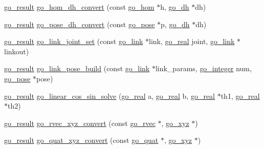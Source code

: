 \begin{DoxyCompactItemize}
\item 
\hyperlink{gotypes_8h_a55d48b38cd959f63c7e8db8337a9792a}{go\-\_\-result} \hyperlink{namespacegomotion_a0a74226c6cb3bb8179462ddcf13071c0}{go\-\_\-hom\-\_\-dh\-\_\-convert} (const \hyperlink{structgomotion_1_1go__hom}{go\-\_\-hom} $\ast$h, \hyperlink{structgomotion_1_1go__dh}{go\-\_\-dh} $\ast$dh)
\item 
\hyperlink{gotypes_8h_a55d48b38cd959f63c7e8db8337a9792a}{go\-\_\-result} \hyperlink{namespacegomotion_a50ed052e0f5e1f8cf7ebbd88bb625529}{go\-\_\-pose\-\_\-dh\-\_\-convert} (const \hyperlink{structgomotion_1_1go__pose}{go\-\_\-pose} $\ast$p, \hyperlink{structgomotion_1_1go__dh}{go\-\_\-dh} $\ast$dh)
\item 
\hyperlink{gotypes_8h_a55d48b38cd959f63c7e8db8337a9792a}{go\-\_\-result} \hyperlink{namespacegomotion_a3ad7a9d8622d81c4643767f386e65c7b}{go\-\_\-link\-\_\-joint\-\_\-set} (const \hyperlink{structgomotion_1_1go__link}{go\-\_\-link} $\ast$link, \hyperlink{gotypes_8h_afd666a2393eebd71ee455846ac9def9b}{go\-\_\-real} joint, \hyperlink{structgomotion_1_1go__link}{go\-\_\-link} $\ast$linkout)
\item 
\hyperlink{gotypes_8h_a55d48b38cd959f63c7e8db8337a9792a}{go\-\_\-result} \hyperlink{namespacegomotion_aab8aefb3568a017fce0b6746433f1e71}{go\-\_\-link\-\_\-pose\-\_\-build} (const \hyperlink{structgomotion_1_1go__link}{go\-\_\-link} $\ast$link\-\_\-params, \hyperlink{gotypes_8h_a7d30f606bb0f58ffe2b3bd71e5c8af5c}{go\-\_\-integer} num, \hyperlink{structgomotion_1_1go__pose}{go\-\_\-pose} $\ast$pose)
\item 
\hyperlink{gotypes_8h_a55d48b38cd959f63c7e8db8337a9792a}{go\-\_\-result} \hyperlink{namespacegomotion_a2f4017a309177fcfd725465ff6d0652b}{go\-\_\-linear\-\_\-cos\-\_\-sin\-\_\-solve} (\hyperlink{gotypes_8h_afd666a2393eebd71ee455846ac9def9b}{go\-\_\-real} a, \hyperlink{gotypes_8h_afd666a2393eebd71ee455846ac9def9b}{go\-\_\-real} b, \hyperlink{gotypes_8h_afd666a2393eebd71ee455846ac9def9b}{go\-\_\-real} $\ast$th1, \hyperlink{gotypes_8h_afd666a2393eebd71ee455846ac9def9b}{go\-\_\-real} $\ast$th2)
\item 
\hyperlink{gotypes_8h_a55d48b38cd959f63c7e8db8337a9792a}{go\-\_\-result} \hyperlink{namespacegomotion_a0241f448104df5bf2349d5378c4b0741}{go\-\_\-rvec\-\_\-xyz\-\_\-convert} (const \hyperlink{structgomotion_1_1go__rvec}{go\-\_\-rvec} $\ast$, \hyperlink{structgomotion_1_1go__xyz}{go\-\_\-xyz} $\ast$)
\item 
\hyperlink{gotypes_8h_a55d48b38cd959f63c7e8db8337a9792a}{go\-\_\-result} \hyperlink{namespacegomotion_a163a10f7d3fef90a12477d42d48e0a3f}{go\-\_\-quat\-\_\-xyz\-\_\-convert} (const \hyperlink{structgomotion_1_1go__quat}{go\-\_\-quat} $\ast$, \hyperlink{structgomotion_1_1go__xyz}{go\-\_\-xyz} $\ast$)

\end{DoxyCompactItemize}
